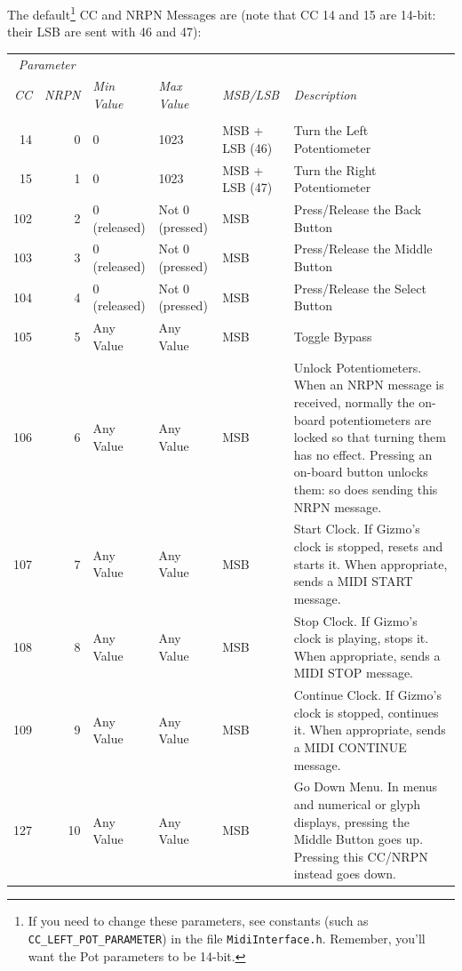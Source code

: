 \documentclass{article}
\begin{document}
\begin{description}
		The default\footnote{If you need to change these parameters, see constants (such as \texttt{CC\_LEFT\_POT\_PARAMETER}) in the file \texttt{MidiInterface.h}.  Remember, you'll want the Pot parameters to be 14-bit.} CC and NRPN Messages are (note that CC 14 and 15 are 14-bit: their LSB are sent with 46 and 47):
		
		\noindent\hspace{-1.5em}\begin{tabular}{@{}rr|lllp{2.4in}@{}}
		\multicolumn{2}{c}{\it Parameter}\\
		{\it CC}&{\it \hspace{-0.8em} NRPN}&{\it Min  Value}&{\it Max Value}&{\it MSB/LSB}&{\it Description}\\[0.1em]
		\hline\\[-0.9em]
		14&0	&0	& 1023 & MSB + LSB (46)& Turn the Left Potentiometer\\
		15&1	&0	& 1023 & MSB + LSB (47) & Turn the Right Potentiometer\\
		102&2	&0 (released)	&Not 0 (pressed) & MSB& Press/Release the Back Button\\
		103&3	&0 (released)	&Not 0  (pressed) & MSB & Press/Release the Middle Button\\
		104&4	&0 (released)	&Not 0 (pressed) & MSB & Press/Release the Select Button\\
		105&5	&Any Value	&Any Value & MSB& Toggle Bypass\\
		106&6	& Any Value &Any Value & MSB& Unlock Potentiometers.  When an NRPN message is received, normally the on-board potentiometers are locked so that turning them has no effect.  Pressing an on-board button unlocks them: so does sending this NRPN message.\\
		107&7	&	Any Value &Any Value & MSB& Start Clock.  If Gizmo's clock is stopped, resets and starts it.  When appropriate, sends a MIDI START message.\\
		108&8	& Any Value	&Any Value & MSB& Stop Clock.  If Gizmo's clock is playing, stops it.  When appropriate, sends a MIDI STOP message.\\
		109&9	&	Any Value &Any Value & MSB & Continue Clock.    If Gizmo's clock is stopped, continues it.  When appropriate, sends a MIDI CONTINUE message.\\
		127&10	&	Any Value &Any Value & MSB & Go Down Menu.   In menus and numerical or glyph displays, pressing the Middle Button goes up.  Pressing this CC/NRPN instead goes down.\\
		\end{tabular}


\end{description}
\end{document}
